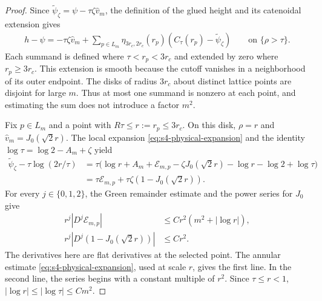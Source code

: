 \documentclass[a4paper,11pt,oneside,reqno]{amsart}
\numberwithin{equation}{section}
\theoremstyle{definition}
\begin{document}
\begin{proof}
    Since $\widetilde\psi_\zeta
       =\psi-\tau\zeta\widehat v_m$, the definition
    of the glued height and its catenoidal extension gives
    \begin{align}
        \label{eq:s4-height-difference-decomposition}
        h-\psi=-\tau\zeta\widehat v_m
          +\sum_{p\in L_m}\eta_{3r_c,2r_c}(r_p)
                  (C_\tau(r_p)-\widetilde\psi_\zeta)
        \qquad\text{on }\{\rho>\tau\}.
    \end{align}
    Each summand is defined where $\tau<r_p<3r_c$
    and extended by zero where $r_p\geq3r_c$.
    This extension is smooth because the cutoff vanishes
    in a neighborhood of its outer endpoint.
    The disks of radius $3r_c$ about distinct lattice
    points are disjoint for large $m$. Thus at most one
    summand is nonzero at each point, and estimating the
    sum does not introduce a factor $m^2$.

    Fix $p\in L_m$ and a point with
    $R\tau\leq r:=r_p\leq3r_c$.
    On this disk, $\rho=r$ and
    $\widehat v_m=J_0(\sqrt2r)$.
    The local expansion \eqref{eq:s4-physical-expansion}
    and the identity $\log\tau=\log2-A_m+\zeta$ yield
    \begin{align*}
        \widetilde\psi_\zeta
               -\tau\log(2r/\tau)
        &=\tau\bigl(\log r+A_m+\mathcal E_{m,p}
                     -\zeta J_0(\sqrt2r)
                     -\log r-\log2+\log\tau\bigr)\\
        &=\tau\mathcal E_{m,p}
                    +\tau\zeta(1-J_0(\sqrt2r)).
    \end{align*}
    For every $j\in\{0,1,2\}$, the Green remainder
    estimate and the power series for $J_0$ give
    \begin{align*}
        r^j|D^j\mathcal E_{m,p}|
            &\leq Cr^2(m^2+|\log r|),\\
        r^j|D^j(1-J_0(\sqrt2r))|&\leq Cr^2.
    \end{align*}
    The derivatives here are flat derivatives at the
    selected point. The annular estimate
    \eqref{eq:s4-physical-expansion}, used at scale $r$,
    gives the first line. In the second line, the series
    begins with a constant multiple of $r^2$.
    Since $\tau\leq r<1$,
    $|\log r|\leq|\log\tau|\leq Cm^2$.


\end{proof}
\end{document}
